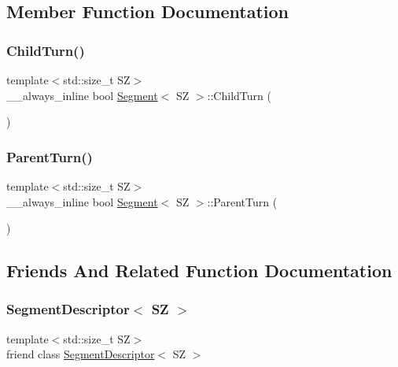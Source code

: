\subsection{Member Function Documentation}
\mbox{\label{classSegment_a502076154e0aaf26e1c67d8b37397b83}} 
\subsubsection{\texorpdfstring{Child\+Turn()}{ChildTurn()}}
{\footnotesize\ttfamily template$<$std\+::size\+\_\+t SZ$>$ \\
\+\_\+\+\_\+always\+\_\+inline bool \hyperlink{classSegment}{Segment}$<$ SZ $>$\+::Child\+Turn (\begin{DoxyParamCaption}{ }\end{DoxyParamCaption})\hspace{0.3cm}{\ttfamily [inline]}}

\mbox{\label{classSegment_a938f93ce0080d9c1b6098e38723aa52f}} 
\subsubsection{\texorpdfstring{Parent\+Turn()}{ParentTurn()}}
{\footnotesize\ttfamily template$<$std\+::size\+\_\+t SZ$>$ \\
\+\_\+\+\_\+always\+\_\+inline bool \hyperlink{classSegment}{Segment}$<$ SZ $>$\+::Parent\+Turn (\begin{DoxyParamCaption}{ }\end{DoxyParamCaption})\hspace{0.3cm}{\ttfamily [inline]}}



\subsection{Friends And Related Function Documentation}
\mbox{\label{classSegment_aa9880fe41382d4118e3f013f9058746d}} 
\subsubsection{\texorpdfstring{Segment\+Descriptor$<$ S\+Z $>$}{SegmentDescriptor< SZ >}}
{\footnotesize\ttfamily template$<$std\+::size\+\_\+t SZ$>$ \\
friend class \hyperlink{classSegmentDescriptor}{Segment\+Descriptor}$<$ SZ $>$\hspace{0.3cm}{\ttfamily [friend]}}




